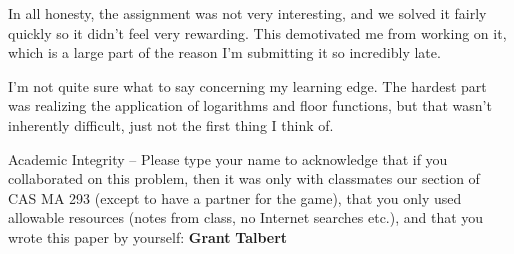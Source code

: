 \documentclass[11pt, letterpaper]{article}
\begin{document}
In all honesty, the assignment was not very interesting, and we solved it fairly quickly so it didn't feel very rewarding. This demotivated me from working on it, which is a large part of the reason I'm submitting it so incredibly late.

I'm not quite sure what to say concerning my learning edge. The hardest part was realizing the application of logarithms and floor functions, but that wasn't inherently difficult, just not the first thing I think of.

	Academic Integrity -- Please type your name to acknowledge that if you collaborated on this
problem, then it was only with classmates our section of CAS MA 293 (except to have a
partner for the game), that you only used allowable resources (notes from class, no Internet
searches etc.), and that you wrote this paper by yourself: \textbf{Grant} \textbf{Talbert}
\end{document}
